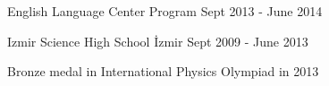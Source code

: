\begin{cventries}
   \cventrywotitle
    {English Language Center Program} %
    {Sept 2013 - June 2014} %

  \cventryspecial
    {} %
    {Izmir Science High School} %
    {İzmir} %
    {Sept 2009 - June 2013} %
    {
    \begin{cvitems}
      \item Bronze medal in International Physics Olympiad in 2013 \end{cvitems}
    }
\end{cventries}

